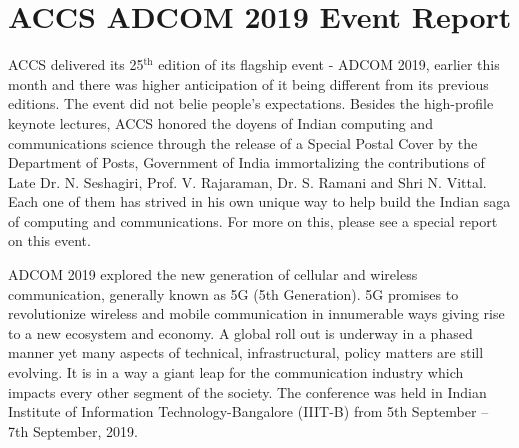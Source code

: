 \chapter{ACCS ADCOM 2019 Event Report}

\begin{multicols}{2}

ACCS delivered its 25$^{\text{th}}$ edition of its flagship event - ADCOM 2019, earlier this month and there was higher anticipation of it being different from its previous editions. The event did not belie people’s expectations. Besides the high-profile keynote lectures, ACCS honored the doyens of Indian computing and communications science through the release of a Special Postal Cover by the Department of Posts, Government of India immortalizing the contributions of Late Dr. N. Seshagiri, Prof. V. Rajaraman, Dr. S. Ramani and Shri N. Vittal. Each one of them has strived in his own unique way to help build the Indian saga of computing and communications. For more on this, please see a special report on this event.

ADCOM 2019 explored the new generation of cellular and wireless communication, generally known as 5G (5th Generation). 5G promises to revolutionize wireless and mobile communication in innumerable ways giving rise to a new ecosystem and economy. A global roll out is underway in a phased manner yet many aspects of technical, infrastructural, policy matters are still evolving. It is in a way a giant leap for the communication industry which impacts every other segment of the society. The conference was held in Indian Institute of Information Technology-Bangalore (IIIT-B) from 5th September – 7th September, 2019. 

\end{multicols}
